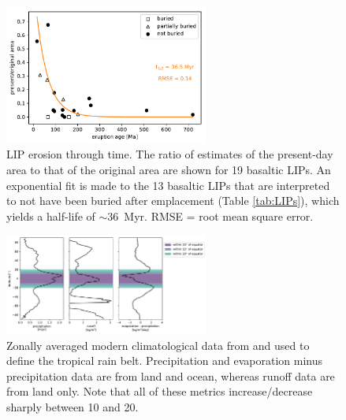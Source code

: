 \documentclass[11pt,letterpaper]{article}
\begin{document}
\begin{figure}[h!]
\begin{center}
	\includegraphics[width=0.6\textwidth]{Manuscript/Figures/LIP_Preservation.pdf}
	\caption{LIP erosion through time. The ratio of estimates of the present-day area to that of the original area are shown for 19 basaltic LIPs. An exponential fit is made to the 13 basaltic LIPs that are interpreted to not have been buried after emplacement (Table \ref{tab:LIPs}), which yields a half-life of $\sim$36~Myr. RMSE = root mean square error.}
	\label{fig:LIP_preservation}
\end{center}
\end{figure}

\begin{figure}[h!]
\begin{center}
	\includegraphics[width=0.6\textwidth]{Manuscript/Figures/Climatology.pdf}
	\caption{Zonally averaged modern climatological data from \citet{Kalnay1996a} and \citet{Trenberth2011a} used to define the tropical rain belt. Precipitation and evaporation minus precipitation data are from land and ocean, whereas runoff data are from land only. Note that all of these metrics increase/decrease sharply between 10 and 20\textdegree\xspace.}
	\label{fig:Climatology}
\end{center}
\end{figure}
\end{document}
